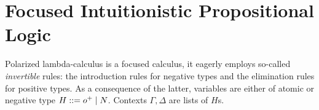 \documentclass[sigplan,screen,fleqn,review]{acmart} %
\begin{document}
\section{Focused Intuitionistic Propositional Logic}
\label{sec:fipl}
\label{sec:pol}



Polarized lambda-calculus
\cite{zeilberger:PhD,espiritoSanto:entcs17}
is a focused calculus, it eagerly employs
so-called \emph{invertible} rules: the introduction rules for negative types and the
elimination rules for positive types.  As a consequence of the latter,
variables are either of atomic or negative type $H ::= o^+ \mid N$.
Contexts $\Gamma,\Delta$ are lists of $H$s.
\end{document}
